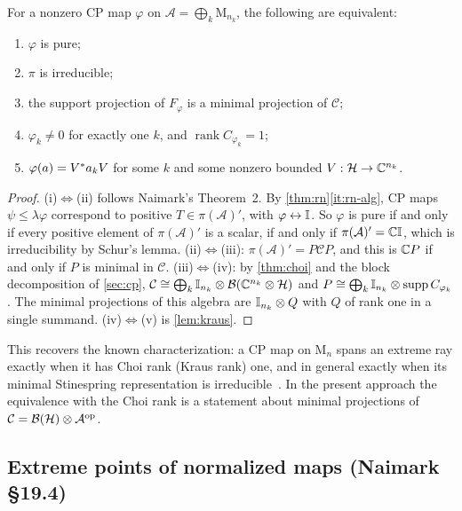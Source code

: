 \documentclass[12pt]{article}
\newcommand{\alg}{\mathcal{A}}             %
\newcommand{\hilb}{\mathcal{H}}            %
\newcommand{\bdd}[1]{\mathcal{B}\br{#1}}   %
\newcommand{\Mn}[1]{\mathrm{M}_{#1}}       %
\newcommand{\op}{^{\mathrm{op}}}           %
\newcommand{\Fphi}{F_{\varphi}}
\newcommand{\comm}{\mathcal{C}}            %
\begin{document}
\begin{theorem}
\label{thm:pure}
For a nonzero CP map \(\varphi\) on \(\alg = \bigoplus_k \Mn{n_k}\), the following
are equivalent:
\begin{enumerate}[label=(\roman*)]
  \item \(\varphi\) is pure;
  \item \(\pi\) is irreducible;
  \item the support projection of \(\Fphi\) is a minimal projection of \(\comm\);
  \item \(\varphi_k \ne 0\) for exactly one \(k\), and \(\operatorname{rank}C_{\varphi_k} = 1\);
  \item \(\varphi(a) = V^* a_k V\) for some \(k\) and some nonzero bounded
    \(V : \hilb \to \complex^{n_k}\).
\end{enumerate}
\end{theorem}
\begin{proof}
(i)\(\Leftrightarrow\)(ii) follows Naimark's Theorem~2. By
\cref{thm:rn}\ref{it:rn-alg}, CP maps \(\psi \le \lambda\varphi\) correspond to
positive \(T \in \pi(\alg)'\), with \(\varphi \leftrightarrow {\mathbb I}\). So \(\varphi\) is
pure if and only if every positive element of \(\pi(\alg)'\) is a scalar, if and
only if \(\pi(\alg)' = \complex\id\), which is irreducibility by Schur's lemma.
(ii)\(\Leftrightarrow\)(iii): \(\pi(\alg)' = P\comm P\), and this is \({\mathbb C} P\)
if and only if \(P\) is minimal in \(\comm\).
(iii)\(\Leftrightarrow\)(iv): by \cref{thm:choi} and the block decomposition of
\cref{sec:cp},
\(\comm \cong \bigoplus_k \id_{n_k} \tensor \bdd{\complex^{n_k} \tensor \hilb}\) and
\(P \cong \bigoplus_k {\mathbb I}_{n_k} \otimes \operatorname{supp}C_{\varphi_k}\). The minimal
projections of this algebra are \({\mathbb I}_{n_k} \otimes Q\) with \(Q\) of rank one in a
single summand. (iv)\(\Leftrightarrow\)(v) is \cref{lem:kraus}.
\end{proof}

\begin{remark}
This recovers the known characterization: a CP map on \(\Mn n\) spans an extreme ray
exactly when it has Choi rank (Kraus rank) one, and in general exactly when its
minimal Stinespring representation is irreducible~\cite{Arveson1969}. In the
present approach the equivalence with the Choi rank is a statement about minimal
projections of \(\comm = \bdd\hilb \tensor \alg\op\).
\end{remark}

\subsection{Extreme points of normalized maps (Naimark \S19.4)}
\label{sec:extreme}
\end{document}
